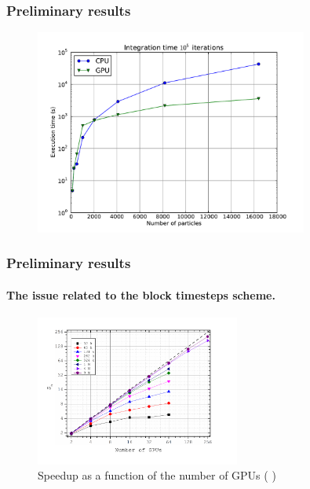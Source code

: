 \begin{frame}
    \frametitle{Preliminary results}
    \begin{figure}
        \centering
        \label{fig:init-time}
        \includegraphics[width=0.8\textwidth]{img/plot-total.pdf}
    \end{figure}
\end{frame}

\begin{frame}
    \frametitle{Preliminary results}
    \framesubtitle{The issue related to the block timesteps scheme.}
    \begin{figure}
        \centering
        \label{fig:higpu}
        \includegraphics[width=0.6\textwidth]{img/higpu-speedup}
        \caption{Speedup as a function of the number of GPUs ( \protect \cite{2012arXiv1207.2367C})}
    \end{figure}
\end{frame}

